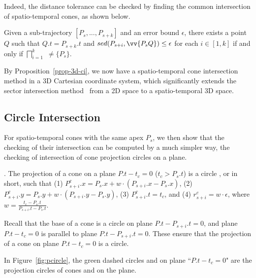 





Indeed, the \sed distance tolerance can be checked by finding the common intersection of spatio-temporal cones, as shown below.


\begin{prop}
\label{prop-3d-ci}
Given a sub-trajectory $[P_s,...,P_{s+k}]$ and an error bound $\epsilon$, there exists a point $Q$ such that $Q.t = P_{s+k}.t$ and $sed(P_{s+i}, \vv{P_sQ})\le \epsilon$ for each $i \in [1,k]$ if and only if $\bigsqcap_{i=1}^{k}$ $\ne \{P_s\}$.
\end{prop}


By Proposition~\ref{prop-3d-ci}, we now have a spatio-temporal cone intersection method in a 3D Cartesian coordinate system, which significantly extends the sector intersection method~\cite{Williams:Longest, Sklansky:Cone, Zhao:Sleeve} {from a 2D space to a spatio-temporal 3D space}.






\subsection{Circle Intersection}
\label{subsec-ProjectionCircle}

For spatio-temporal cones with the same apex $P_s$, we then show that the checking of their intersection can be computed by a much simpler way, \ie the checking of intersection of cone projection circles on a plane.

. The projection of a cone  on a plane $P.t- t_c = 0$ ($t_c > P_s.t$) is a circle , or  in short, such that
%
(1) $P^c_{s+i}.x = P_s.x +  w\cdot(P_{s+i}.x- P_{s}.x)$,
%
(2) $P^c_{s+i}.y = P_s.y +  w\cdot(P_{s+i}.y- P_{s}.y)$,
%
(3) $P^c_{s+i}.t = t_c$, and
%
(4) $r^c_{s+i} =w\cdot\epsilon$, where $w=\frac{t_c - P_s.t}{P_{s+i}.t - P_s.t}$.


Recall that the base of a cone  is a circle on plane $P.t-P_{s+i}.t = 0$, and plane $P.t- t_c = 0$ is parallel to plane $P.t-P_{s+i}.t = 0$. These  ensure that the projection of a cone on plane $P.t -t_c = 0$ is a circle.

\begin{example}
\label{exm-projection-circles}
In Figure~\ref{fig:pcircle}, the green dashed circles  and  on plane ``$P.t-t_{c}=0$" are the projection circles of cones  and  on the plane. \eop
\end{example}



